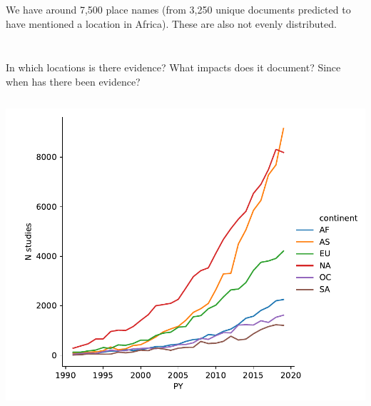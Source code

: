 \documentclass[9pt]{beamer}
\begin{document}
\begin{frame}{We have around 7,500 place names (from 3,250 unique documents predicted to have mentioned a location in Africa). These are also not evenly distributed.}
\begin{columns}
\begin{column}{0.5\linewidth}
\begin{figure}
		\end{figure}
	\end{column}
\end{columns}

\end{frame}


\begin{frame}{In which locations is there evidence? What impacts does it document? Since when has there been evidence?}

\begin{columns}
	\begin{column}{0.382\linewidth}
		\includegraphics[width=\linewidth]{../plots/literature_distribution/PY_continent_n.pdf}
		

\end{column}
\end{columns}
\end{frame}
\end{document}
